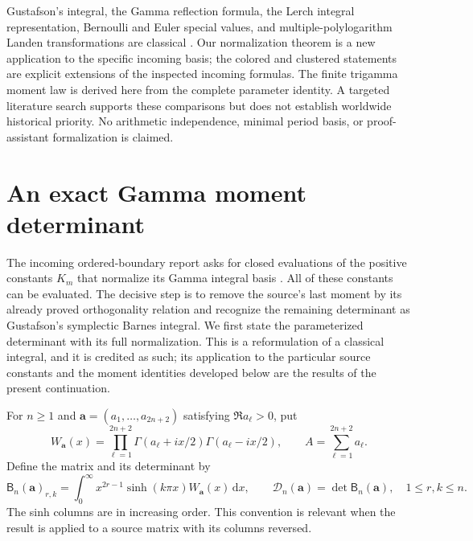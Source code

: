 \documentclass[11pt,a4paper]{article}
\numberwithin{equation}{section}
\theoremstyle{definition}
\theoremstyle{remark}
\newcommand{\dd}{\,\mathrm d}
\begin{document}
Gustafson's integral, the Gamma reflection formula, the Lerch integral
representation, Bernoulli and Euler special values, and
multiple-polylogarithm Landen transformations are classical
\cite{gustafson1994,derkachov2017,dlmfgamma,dlmflerch,dlmfhurwitz,okudaueno}.
Our normalization theorem is a new application to the specific
incoming basis; the colored and clustered statements are explicit
extensions of the inspected incoming formulas. The finite trigamma
moment law is derived here from the complete parameter identity.
A targeted literature search supports these comparisons but does not
establish worldwide historical priority. No arithmetic independence,
minimal period basis, or proof-assistant formalization is claimed.



\section{An exact Gamma moment determinant}
\label{gn:sec:determinant}

The incoming ordered-boundary report asks for closed evaluations of the
positive constants $K_m$ that normalize its Gamma integral basis
\cite[Section~8 and Section~9, question~2]{repoordered}.  All of these
constants can be evaluated.  The decisive step is to remove the source's
last moment by its already proved orthogonality relation and recognize
the remaining determinant as Gustafson's symplectic Barnes integral.
We first state the parameterized determinant with its full normalization.
This is a reformulation of a classical integral, and it is credited as
such; its application to the particular source constants and the moment
identities developed below are the results of the present continuation.

For $n\ge1$ and $\mathbf a=(a_1,\ldots,a_{2n+2})$ satisfying
$\Re a_\ell>0$, put
\begin{equation}\label{gn:eq:weight}
 W_{\mathbf a}(x)=\prod_{\ell=1}^{2n+2}
       \Gamma(a_\ell+ix/2)\Gamma(a_\ell-ix/2),
 \qquad A=\sum_{\ell=1}^{2n+2}a_\ell.
\end{equation}
Define the matrix and its determinant by
\begin{equation}\label{gn:eq:matrix}
 \mathsf B_n(\mathbf a)_{r,k}
 =\int_0^\infty x^{2r-1}\sinh(k\pi x)W_{\mathbf a}(x)\dd x,
 \qquad
 \mathcal D_n(\mathbf a)=\det\mathsf B_n(\mathbf a),
 \quad 1\le r,k\le n.
\end{equation}
The sinh columns are in increasing order.  This convention is relevant
when the result is applied to a source matrix with its columns reversed.
\end{document}
